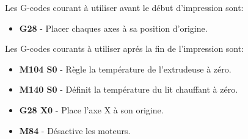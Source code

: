 Les G-codes courant \`a utiliser avant le d\'ebut d'impression sont:
\begin{itemize}
	\item \textbf{G28}  - Placer chaques axes \`a sa position d'origine.
\end{itemize}


Les G-codes courants \`a utiliser apr\'es la fin de l'impression sont:
\begin{itemize}
	\item \textbf{M104 S0}  - R\`egle la temp\'erature de l'extrudeuse \`a z\'ero.
	\item \textbf{M140 S0} - D\'efinit la temp\'erature du lit chauffant \`a z\'ero.
	\item \textbf{G28 X0} - Place l'axe X \`a son origine.
	\item \textbf{M84}  - D\'esactive les moteurs.
\end{itemize}

